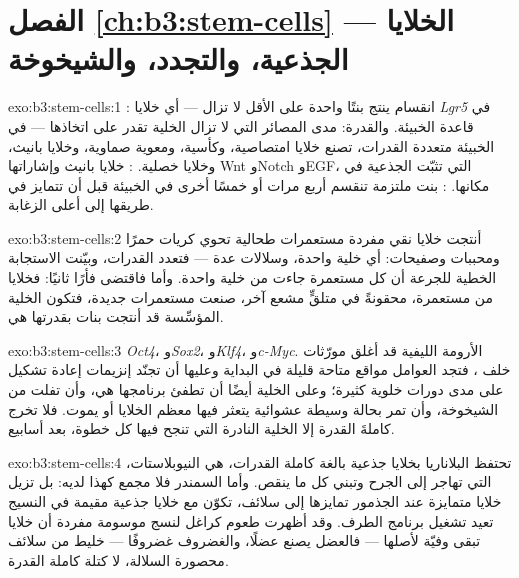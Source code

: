 \section*{الفصل \ref{ch:b3:stem-cells} --- الخلايا الجذعية، والتجدد، والشيخوخة}

\begin{solution}{exo:b3:stem-cells:1}
: انقسام ينتج بنتًا واحدة على الأقل لا تزال
 --- أي خلايا \emph{Lgr5} في قاعدة الخبيئة.
والقدرة: مدى المصائر التي لا تزال الخلية تقدر على اتخاذها ---
 في الخبيئة متعددة القدرات، تصنع خلايا
امتصاصية، وكأسية، ومعوية صماوية، وخلايا بانيث، وخلايا
خصلية. : خلايا بانيث وإشاراتها Wnt وNotch وEGF، التي
تثبّت الجذعية في مكانها. : بنت ملتزمة
تنقسم أربع مرات أو خمسًا أخرى في الخبيئة قبل أن تتمايز في
طريقها إلى أعلى الزغابة.
\end{solution}

\begin{solution}{exo:b3:stem-cells:2}
أنتجت خلايا نقي مفردة مستعمرات طحالية تحوي كريات حمرًا
ومحببات وصفيحات: أي خلية واحدة، وسلالات عدة --- فتعدد
القدرات، وبيّنت الاستجابة الخطية للجرعة أن كل مستعمرة جاءت
من خلية واحدة. وأما  فاقتضى فأرًا ثانيًا:
فخلايا من مستعمرة، محقونةً في متلقٍّ مشعع آخر، صنعت مستعمرات
جديدة، فتكون الخلية المؤسِّسة قد أنتجت بنات بقدرتها هي.
\end{solution}

\begin{solution}{exo:b3:stem-cells:3}
\emph{Oct4}، و\emph{Sox2}، و\emph{Klf4}، و\emph{c-Myc}. 
الأرومة الليفية قد أغلق مورّثات  خلف 
، فتجد العوامل مواقع متاحة قليلة في البداية وعليها
أن تجنّد إنزيمات إعادة تشكيل على مدى دورات خلوية كثيرة؛ وعلى
الخلية أيضًا أن تطفئ برنامجها هي، وأن تفلت من الشيخوخة، وأن
تمر بحالة وسيطة عشوائية يتعثر فيها معظم الخلايا أو يموت.
فلا تخرج كاملةَ القدرة إلا الخلية النادرة التي تنجح فيها كل
خطوة، بعد أسابيع.
\end{solution}

\begin{solution}{exo:b3:stem-cells:4}
تحتفظ البلاناريا بخلايا جذعية بالغة كاملة القدرات، هي
النيوبلاستات، التي تهاجر إلى الجرح وتبني كل ما ينقص. وأما
السمندر فلا مجمع كهذا لديه: بل تزيل خلايا متمايزة عند
الجذمور تمايزها إلى سلائف، تكوّن مع خلايا جذعية مقيمة في
النسيج  تعيد تشغيل برنامج الطرف. وقد أظهرت طعوم
كراغل لنسج موسومة مفردة أن خلايا  تبقى وفيّة
لأصلها --- فالعضل يصنع عضلًا، والغضروف غضروفًا --- 
خليط من سلائف محصورة السلالة، لا كتلة كاملة القدرة.
\end{solution}

